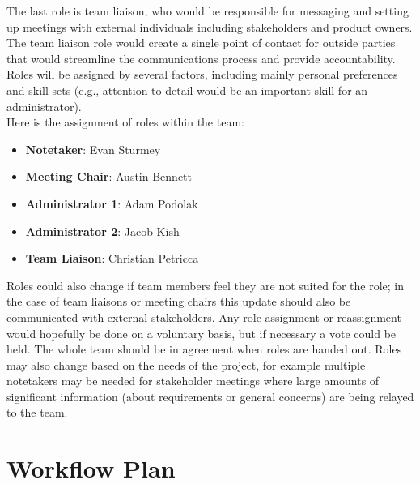 \documentclass{article}
\begin{document}
The last role is team liaison, who would be responsible for messaging and setting up meetings with external individuals including stakeholders and product owners. The team liaison role would create a single point of contact for outside parties that would streamline the communications process and provide accountability.\\

Roles will be assigned by several factors, including mainly personal preferences and skill sets (e.g., attention to detail would be an important skill for an administrator).\\

Here is the assignment of roles within the team:

\begin{itemize}
    \item \textbf{Notetaker}: Evan Sturmey
    \item \textbf{Meeting Chair}: Austin Bennett
    \item \textbf{Administrator 1}: Adam Podolak
    \item \textbf{Administrator 2}: Jacob Kish
    \item \textbf{Team Liaison}: Christian Petricca
\end{itemize}

 Roles could also change if team members feel they are not suited for the role; in the case of team liaisons or meeting chairs this update should also be communicated with external stakeholders. Any role assignment or reassignment would hopefully be done on a voluntary basis, but if necessary a vote could be held. The whole team should be in agreement when roles are handed out. Roles may also change based on the needs of the project, for example multiple notetakers may be needed for stakeholder meetings where large amounts of significant information (about requirements or general concerns) are being relayed to the team.

\section{Workflow Plan}
\end{document}
